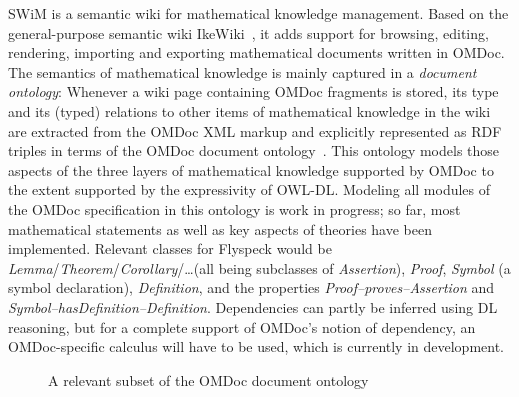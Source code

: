 \documentclass{llncs}
\begin{document}
SWiM is a semantic wiki for mathematical knowledge management.  Based on the
general-purpose semantic wiki IkeWiki~\cite{KrSchVr:semwiki-reasoning07}, it adds support
for browsing, editing, rendering, importing and exporting mathematical documents written
in OMDoc.  The semantics of mathematical knowledge is mainly captured in a \emph{document
  ontology}: Whenever a wiki page containing OMDoc fragments is stored, its type and its
(typed) relations to other items of mathematical knowledge in the wiki are extracted from
the OMDoc XML markup and explicitly represented as RDF triples in terms of the OMDoc
document ontology~\cite{OMDocDocOnto:web}.  This ontology models those aspects of the
three layers of mathematical knowledge supported by OMDoc to the extent supported by the
expressivity of OWL-DL.  Modeling all modules of the OMDoc specification in this ontology
is work in progress; so far, most mathematical statements as well as key aspects of
theories have been implemented.  Relevant classes for Flyspeck would be
\textit{Lemma}/\textit{Theorem}/\textit{Corollary}/\ldots (all being subclasses of
\textit{Assertion}), \textit{Proof}, \textit{Symbol} (a symbol declaration),
\textit{Definition}, and the properties \textit{Proof--proves--Assertion} and
\textit{Symbol--hasDefinition--Definition}.  Dependencies can partly be inferred using DL
reasoning, but for a complete support of OMDoc's notion of dependency, an OMDoc-specific
calculus will have to be used, which is currently in development.

\begin{figure}
  \centering
  \caption{A relevant subset of the OMDoc document ontology}
  \label{fig:doconto}
\end{figure}
\end{document}
